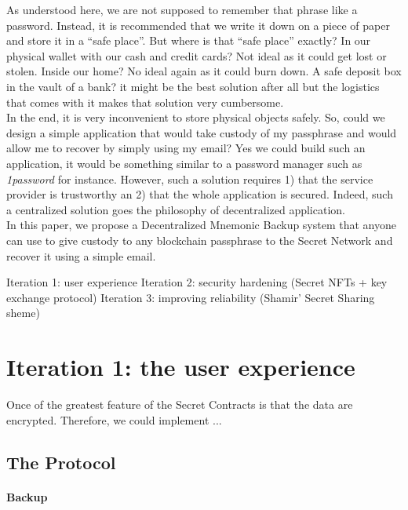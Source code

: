 \documentclass[12pt]{article}
\begin{document}
As understood here, we are not supposed to remember that phrase like a password. Instead, it is recommended that we write it down on a piece of paper and store it in a ``safe place''. But where is that ``safe place'' exactly? In our physical wallet with our cash and credit cards? Not ideal as it could get lost or stolen. Inside our home? No ideal again as it could burn down. A safe deposit box in the vault of a bank? it might be the best solution after all but the logistics that comes with it makes that solution very cumbersome. \\
 
In the end, it is very inconvenient to store physical objects safely. So, could we design a simple application that would take custody of my passphrase and would allow me to recover by simply using my email? Yes we could build such an application, it would be something similar to a password manager such as {\em 1password} \cite{1password} for instance. However, such a solution requires 1) that the service provider is trustworthy an 2) that the whole application is secured. Indeed, such a centralized solution goes the philosophy of decentralized application. \\

In this paper, we propose a Decentralized Mnemonic Backup system that anyone can use to give custody to any blockchain passphrase to the Secret Network \cite{SecretNetwork} and recover it using a simple email. 

Iteration 1: user experience
Iteration 2: security hardening (Secret NFTs + key exchange protocol)
Iteration 3: improving reliability (Shamir' Secret Sharing sheme)

\section{Iteration 1: the user experience}

Once of the greatest feature of the Secret Contracts is that the data are encrypted. Therefore, we could implement ... 

\subsection{The Protocol}

\paragraph{Backup}
\end{document}
